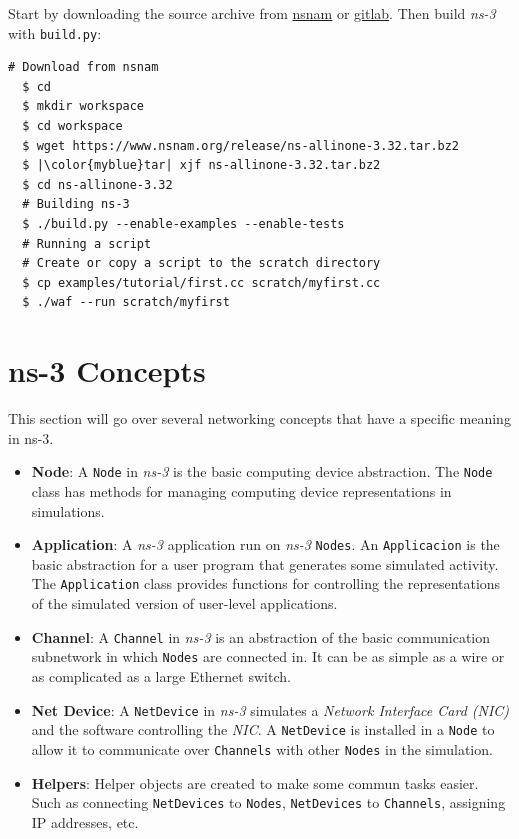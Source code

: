 Start by downloading the source archive from \href{https://www.nsnam.org/release/ns-allinone-3.32.tar.bz2}{nsnam}
or \href{https://gitlab.com/nsnam/ns-3-allinone.git}{gitlab}. Then build \textit{ns-3} with \texttt{build.py}:

\begin{lstlisting}[language=myshell,caption={Download and installation of ns-3}, captionpos=b]
  # Download from nsnam
  $ cd
  $ mkdir workspace
  $ cd workspace
  $ wget https://www.nsnam.org/release/ns-allinone-3.32.tar.bz2
  $ |\color{myblue}tar| xjf ns-allinone-3.32.tar.bz2
  $ cd ns-allinone-3.32
  # Building ns-3
  $ ./build.py --enable-examples --enable-tests
  # Running a script
  # Create or copy a script to the scratch directory
  $ cp examples/tutorial/first.cc scratch/myfirst.cc
  $ ./waf --run scratch/myfirst
\end{lstlisting}

\section{ns-3 Concepts}
\label{sec:ns3conc}
This section will go over several networking concepts that have a specific meaning in ns-3.

\begin{itemize}[topsep=0pt]
  \item[] \textbf{Node}: A \texttt{Node} in \textit{ns-3} is the basic computing device abstraction. 
  The \texttt{Node} class has methods for managing computing device representations in simulations.
  \item[] \textbf{Application}: A \textit{ns-3} application run on \textit{ns-3} \texttt{Nodes}. An 
  \texttt{Applicacion} is the basic abstraction for a user program that generates some simulated activity.  
  The \texttt{Application} class provides functions for controlling the representations of the simulated
  version of user-level applications.
  \item[] \textbf{Channel}: A \texttt{Channel} in \textit{ns-3} is an abstraction of the basic communication 
  subnetwork in which \texttt{Nodes} are connected in. It can be as simple as a wire or as complicated as a
  large Ethernet switch.
  \item[] \textbf{Net Device}: A \texttt{NetDevice} in \textit{ns-3} simulates a \textit{Network Interface Card (NIC)}
  and the software controlling the \textit{NIC}. A \texttt{NetDevice} is installed in a \texttt{Node} to allow 
  it to communicate over \texttt{Channels} with other \texttt{Nodes} in the simulation.
  \item[] \textbf{Helpers}: Helper objects are created to make some commun tasks easier. Such as connecting
  \texttt{NetDevices} to \texttt{Nodes}, \texttt{NetDevices} to \texttt{Channels}, assigning IP addresses, etc. 
\end{itemize}

